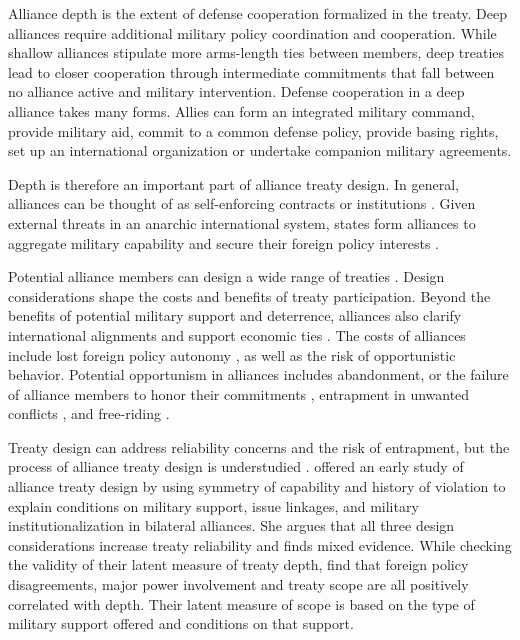 \documentclass[12pt]{article}
\begin{document}
Alliance depth is the extent of defense cooperation formalized in the treaty. 
Deep alliances require additional military policy coordination and cooperation. 
While shallow alliances stipulate more arms-length ties between members, deep treaties lead to closer cooperation through intermediate commitments that fall between no alliance active and military intervention. 
Defense cooperation in a deep alliance takes many forms. 
Allies can form an integrated military command, provide military aid, commit to a common defense policy, provide basing rights, set up an international organization or undertake companion military agreements. 


Depth is therefore an important part of alliance treaty design.
In general, alliances can be thought of as self-enforcing contracts or institutions \citep{Leedsetal2002, Morrow2000}.
Given external threats in an anarchic international system, states form alliances to aggregate military capability and secure their foreign policy interests \citep{Altfield1984, Smith1995, Snyder1997, FordhamPoast2014}. 


Potential alliance members can design a wide range of treaties \citep{Leedsetal2000, Leedsetal2002, Benson2012, BensonClinton2016}. 
Design considerations shape the costs and benefits of treaty participation. 
Beyond the benefits of potential military support and deterrence, alliances also clarify international alignments \citep{Snyder1990} and support economic ties \citep{Gowa1995, Li2003, Long2003, Fordham2010, WolfordKim2017}. 
The costs of alliances include lost foreign policy autonomy \citep{Altfield1984, Morrow2000, Johnson2015}, as well as the risk of opportunistic behavior. 
Potential opportunism in alliances includes abandonment, or the failure of alliance members to honor their commitments \citep{BerkemeierFuhrmann2018}, entrapment in unwanted conflicts \citep{Snyder1984}, and free-riding \citep{Morrow2000}.   


Treaty design can address reliability concerns and the risk of entrapment, but the process of alliance treaty design is understudied \citep{Poast2019a}. 
\citet{Mattes2012} offered an early study of alliance treaty design by using symmetry of capability and history of violation to explain conditions on military support, issue linkages, and military institutionalization in bilateral alliances. 
She argues that all three design considerations increase treaty reliability and finds mixed evidence.  
While checking the validity of their latent measure of treaty depth, \citet{BensonClinton2016} find that foreign policy disagreements, major power involvement and treaty scope are all positively correlated with depth. 
Their latent measure of scope is based on the type of military support offered and conditions on that support. 
\end{document}
